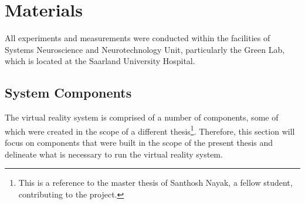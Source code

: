 
\section{Materials}
All experiments and measurements were conducted within the facilities of Systems Neuroscience and Neurotechnology Unit, particularly the Green Lab, which is located at the Saarland University Hospital. 

\subsection{System Components}
The virtual reality system is comprised of a number of components, some of which were created in the scope of a different thesis\footnote{This is a reference to the master thesis of Santhosh Nayak, a fellow student, contributing to the project.}. Therefore, this section will focus on components that were built in the scope of the present thesis and delineate what is necessary to run the virtual reality system.
  

